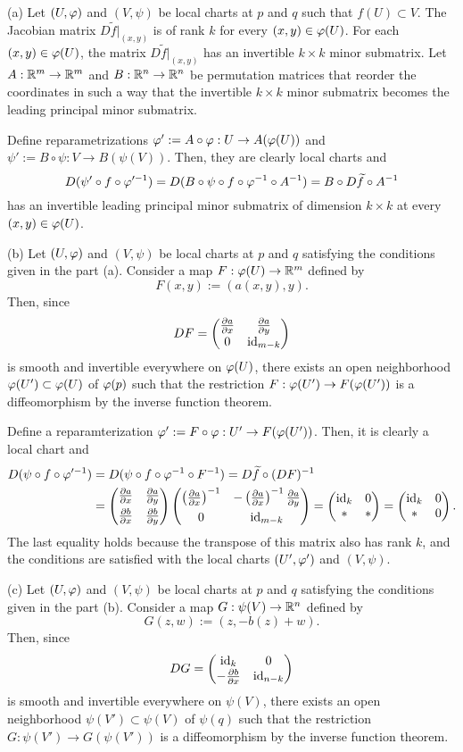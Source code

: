 \documentclass{../../large}
\begin{document}
\begin{pf}
(a)
Let $(U,\varphi)$ and $(V,\psi)$ be local charts at $p$ and $q$ such that $f(U)\subset V$.
The Jacobian matrix $D\tilde f|_{(x,y)}$ is of rank $k$ for every $(x,y)\in\varphi(U)$.
For each $(x,y)\in\varphi(U)$, the matrix $D\tilde f|_{(x,y)}$ has an invertible $k\times k$ minor submatrix.
Let $A:\mathbb{R}^m\to\mathbb{R}^m$ and $B:\mathbb{R}^n\to\mathbb{R}^n$ be permutation matrices that reorder the coordinates in such a way that the invertible $k\times k$ minor submatrix becomes the leading principal minor submatrix.

Define reparametrizations $\varphi':=A\circ\varphi:U\to A(\varphi(U))$ and $\psi':=B\circ\psi:V\to B(\psi(V))$.
Then, they are clearly local charts and
\[D(\psi'\circ f\circ\varphi'^{-1})=D(B\circ\psi\circ f\circ\varphi^{-1}\circ A^{-1})=B\circ D\widetilde f\circ A^{-1}\]
has an invertible leading principal minor submatrix of dimension $k\times k$ at every $(x,y)\in\varphi(U)$.

(b)
Let $(U,\varphi)$ and $(V,\psi)$ be local charts at $p$ and $q$ satisfying the conditions given in the part (a).
Consider a map $F:\varphi(U)\to\mathbb{R}^m$ defined by
\[F(x,y):=(a(x,y),y).\]
Then, since
\[DF=\mat{\pd{a}{x}&\pd{a}{y}\\0&\id_{m-k}}\]
is smooth and invertible everywhere on $\varphi(U)$, there exists an open neighborhood $\varphi(U')\subset\varphi(U)$ of $\varphi(p)$ such that the restriction $F:\varphi(U')\to F(\varphi(U'))$ is a diffeomorphism by the inverse function theorem.

Define a reparamterization $\varphi':=F\circ\varphi:U'\to F(\varphi(U'))$.
Then, it is clearly a local chart and
\begin{align*}
D(\psi\circ f\circ\f'^{-1})
&=D(\psi\circ f\circ\f^{-1}\circ F^{-1})
=D\tilde f\circ(DF)^{-1}\\
&=\mat{\pd{a}{x}&\pd{a}{y}\\[4pt]\pd{b}{x}&\pd{b}{y}}\mat{\left(\pd{a}{x}\right)^{-1}&-\left(\pd{a}{x}\right)^{-1}\pd{a}{y}\\[4pt]0&\id_{m-k}}
=\mat{\id_k&0\\\ast&\ast}=\mat{\id_k&0\\\ast&0}.
\end{align*}
The last equality holds because the transpose of this matrix also has rank $k$, and the conditions are satisfied with the local charts $(U',\varphi')$ and $(V,\psi)$.

(c)
Let $(U,\varphi)$ and $(V,\psi)$ be local charts at $p$ and $q$ satisfying the conditions given in the part (b).
Consider a map $G:\psi(V)\to\mathbb{R}^n$ defined by
\[G(z,w):=(z,-b(z)+w).\]
Then, since
\[DG=\mat{\id_k&0\\-\pd{b}{x}&\id_{n-k}}\]
is smooth and invertible everywhere on $\psi(V)$, there exists an open neighborhood $\psi(V')\subset\psi(V)$ of $\psi(q)$ such that the restriction $G:\psi(V')\to G(\psi(V'))$ is a diffeomorphism by the inverse function theorem.


\end{pf}
\end{document}
